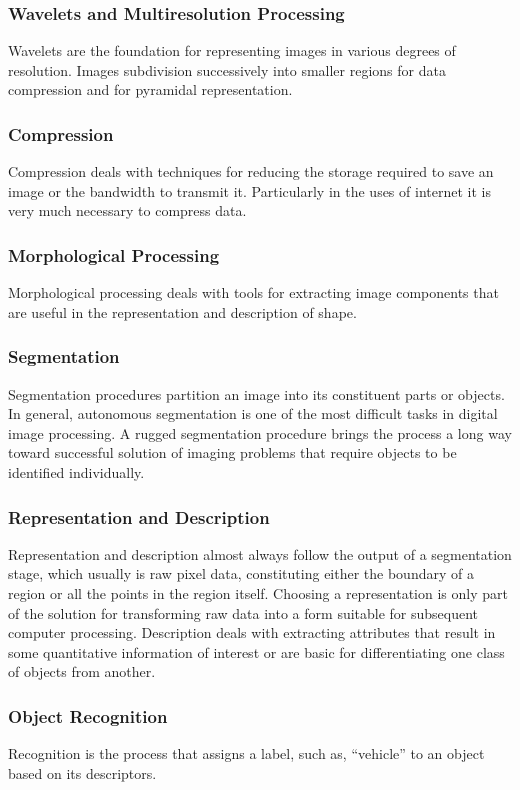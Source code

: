         \subsubsection{Wavelets and Multiresolution Processing}
            Wavelets are the foundation for representing images in various degrees of resolution. Images subdivision successively into smaller 
            regions for data compression and for pyramidal representation.
        \subsubsection{Compression}
            Compression deals with techniques for reducing the storage required to save an image or the bandwidth to transmit it. Particularly in 
            the uses of internet it is very much necessary to compress data.
        \subsubsection{Morphological Processing}
            Morphological processing deals with tools for extracting image components that are useful in the representation and description of shape.
        \subsubsection{Segmentation}
            Segmentation procedures partition an image into its constituent parts or objects. In general, autonomous segmentation is one of the most difficult 
            tasks in digital image processing. A rugged segmentation procedure brings the process a long way toward successful solution of imaging problems that 
            require objects to be identified individually.
        \subsubsection{Representation and Description}
            Representation and description almost always follow the output of a segmentation stage, which usually is raw pixel data, constituting either the boundary 
            of a region or all the points in the region itself. Choosing a representation is only part of the solution for transforming raw data into a form suitable 
            for subsequent computer processing. Description deals with extracting attributes that result in some quantitative information of interest or are basic for 
            differentiating one class of objects from another.
        \subsubsection{Object Recognition}
            Recognition is the process that assigns a label, such as, “vehicle” to an object based on its descriptors.
